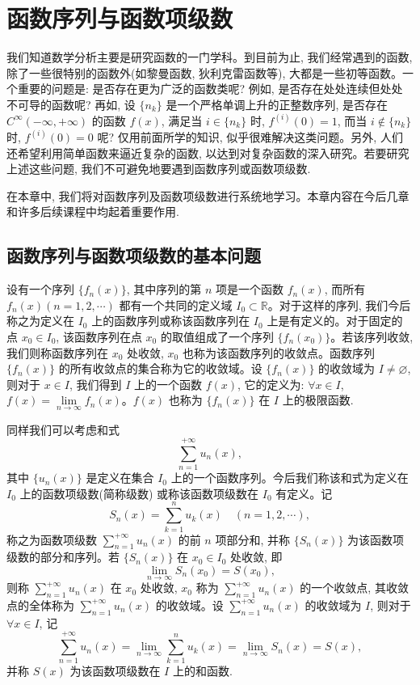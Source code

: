 \setcounter{chapter}{9} %
\chapter{函数序列与函数项级数}
\label{chap:ma-10}

我们知道数学分析主要是研究函数的一门学科。到目前为止, 我们经常遇到的函数, 除了一些很特别的函数外(如黎曼函数, 狄利克雷函数等), 大都是一些初等函数。一个重要的问题是: 是否存在更为广泛的函数类呢? 例如, 是否存在处处连续但处处不可导的函数呢? 再如, 设 $\{n_k\}$ 是一个严格单调上升的正整数序列, 是否存在 $C^\infty(-\infty,+\infty)$ 的函数 $f(x)$, 满足当 $i\in\{n_k\}$ 时, $f^{(i)}(0)=1$, 而当 $i\notin\{n_k\}$ 时, $f^{(i)}(0)=0$ 呢? 仅用前面所学的知识, 似乎很难解决这类问题。另外, 人们还希望利用简单函数来逼近复杂的函数, 以达到对复杂函数的深入研究。若要研究上述这些问题, 我们不可避免地要遇到函数序列或函数项级数.

在本章中, 我们将对函数序列及函数项级数进行系统地学习。本章内容在今后几章和许多后续课程中均起着重要作用.

\section{函数序列与函数项级数的基本问题}
\label{sec:ma-10-1}

设有一个序列 $\{f_n(x)\}$, 其中序列的第 $n$ 项是一个函数 $f_n(x)$, 而所有 $f_n(x)(n=1,2,\cdots)$ 都有一个共同的定义域 $I_0\subset\mathbb R$。对于这样的序列, 我们今后称之为定义在 $I_0$ 上的函数序列或称该函数序列在 $I_0$ 上是有定义的。对于固定的点 $x_0\in I_0$, 该函数序列在点 $x_0$ 的取值组成了一个序列 $\{f_n(x_0)\}$。若该序列收敛, 我们则称函数序列在 $x_0$ 处收敛, $x_0$ 也称为该函数序列的收敛点。函数序列 $\{f_n(x)\}$ 的所有收敛点的集合称为它的收敛域。设 $\{f_n(x)\}$ 的收敛域为 $I\ne\varnothing$, 则对于 $x\in I$, 我们得到 $I$ 上的一个函数 $f(x)$, 它的定义为: $\forall x\in I$, $f(x)=\lim\limits_{n\to\infty}f_n(x)$。$f(x)$ 也称为 $\{f_n(x)\}$ 在 $I$ 上的极限函数.

同样我们可以考虑和式
\[
  \sum_{n=1}^{+\infty}u_n(x),
\]
其中 $\{u_n(x)\}$ 是定义在集合 $I_0$ 上的一个函数序列。今后我们称该和式为定义在 $I_0$ 上的函数项级数(简称级数) 或称该函数项级数在 $I_0$ 有定义。记
\[
  S_n(x)=\sum_{k=1}^n u_k(x)\quad(n=1,2,\cdots),
\]
称之为函数项级数 $\sum\limits_{n=1}^{+\infty}u_n(x)$ 的前 $n$ 项部分和, 并称 $\{S_n(x)\}$ 为该函数项级数的部分和序列。若 $\{S_n(x)\}$ 在 $x_0\in I_0$ 处收敛, 即
\[
  \lim_{n\to\infty}S_n(x_0)=S(x_0),
\]
则称 $\sum\limits_{n=1}^{+\infty}u_n(x)$ 在 $x_0$ 处收敛, $x_0$ 称为 $\sum\limits_{n=1}^{+\infty}u_n(x)$ 的一个收敛点, 其收敛点的全体称为 $\sum\limits_{n=1}^{+\infty}u_n(x)$ 的收敛域。设 $\sum\limits_{n=1}^{+\infty}u_n(x)$ 的收敛域为 $I$, 则对于 $\forall x\in I$, 记
\[
  \sum_{n=1}^{+\infty}u_n(x)=\lim_{n\to\infty}\sum_{k=1}^n u_k(x)=\lim_{n\to\infty}S_n(x)=S(x),
\]
并称 $S(x)$ 为该函数项级数在 $I$ 上的和函数.

